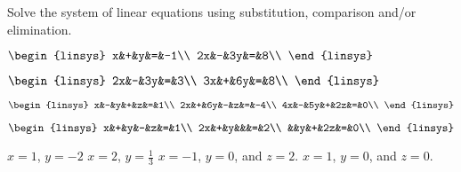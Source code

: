 

\begin{Exercise}[
name={},
title={}, 
difficulty=0,
origin={\cite{GH}}]
Solve the system of linear equations using substitution, comparison and/or elimination.
\begin{multicols}{2}
\Question
$
\begin{linsys}{2}
x&+&y&=&-1\\
2x&-&3y&=&8\\
\end{linsys}
$

\Question
$
\begin{linsys}{2}
2x&-&3y&=&3\\
3x&+&6y&=&8\\
\end{linsys}
$

\Question
$
\begin{linsys}{3}
x&-&y&+&z&=&1\\
2x&+&6y&-&z&=&-4\\
4x&-&5y&+&2z&=&0\\
\end{linsys}
$

\Question
$
\begin{linsys}{3}
x&+&y&-&z&=&1\\
2x&+&y&&&=&2\\
&&y&+&2z&=&0\\
\end{linsys}
$
\EndCurrentQuestion
\end{multicols}
\end{Exercise}

\begin{Answer}
\Question $x=1$, $y=-2$
\Question $x=2$, $y=\frac13$
\Question $x=-1$, $y=0$, and $z=2$.
\Question $x=1$, $y=0$, and $z=0$.
\end{Answer}
